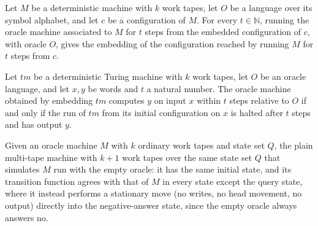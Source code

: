\begin{theorem}
\label{Turing.OracleTM.runFrom_ofMultiTapeTM}
\leanok
{}
Let $M$ be a deterministic machine with $k$ work tapes, let $O$ be a language over its
symbol alphabet, and let $c$ be a configuration of $M$. For every $t\in\mathbb{N}$,
running the oracle machine associated to $M$ for $t$ steps from the embedded
configuration of $c$, with oracle $O$, gives the embedding of the configuration reached
by running $M$ for $t$ steps from $c$.
\end{theorem}

\begin{theorem}
\label{Turing.OracleTM.computesInTime_ofMultiTapeTM}
\leanok
{}
Let $tm$ be a deterministic Turing machine with $k$ work tapes, let $O$ be an oracle
language, and let $x,y$ be words and $t$ a natural number. The oracle machine obtained
by embedding $tm$ computes $y$ on input $x$ within $t$ steps relative to $O$ if and only
if the run of $tm$ from its initial configuration on $x$ is halted after $t$ steps and
has output $y$.
\end{theorem}

\begin{definition}
\label{Turing.OracleTM.plainEmptyOracle}
\leanok
{}
Given an oracle machine $M$ with $k$ ordinary work tapes and state set $Q$,
the plain multi-tape machine with $k+1$ work tapes over the same state set $Q$
that simulates $M$ run with the empty oracle: it has the same initial state,
and its transition function agrees with that of $M$ in every state except the
query state, where it instead performs a stationary move (no writes, no head
movement, no output) directly into the negative-answer state, since the empty
oracle always answers no.
\end{definition}

